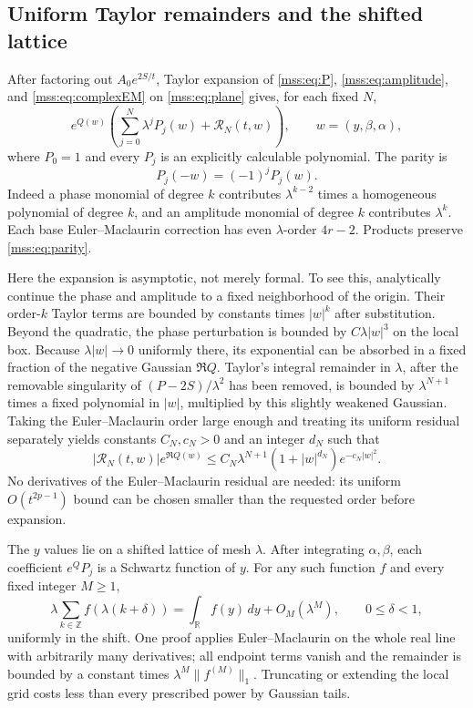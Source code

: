 \documentclass[11pt,letterpaper]{article}
\numberwithin{equation}{section}
\theoremstyle{definition}\newtheorem{definition}[theorem]{Definition}
\theoremstyle{remark}\newtheorem{remark}[theorem]{Remark}
\newcommand{\R}{\mathbb R}
\newcommand{\Z}{\mathbb Z}
\begin{document}
\subsection{Uniform Taylor remainders and the shifted lattice}
After factoring out $A_0e^{2S/t}$, Taylor expansion of \eqref{mss:eq:P}, \eqref{mss:eq:amplitude}, and \eqref{mss:eq:complexEM} on \eqref{mss:eq:plane} gives, for each fixed $N$,
\begin{equation}\label{mss:eq:expansionlocal}
e^{Q(w)}\left(\sum_{j=0}^{N}\lambda^j P_j(w)
+\mathcal R_N(t,w)\right),\qquad w=(y,\beta,\alpha),
\end{equation}
where $P_0=1$ and every $P_j$ is an explicitly calculable polynomial. The parity is
\begin{equation}\label{mss:eq:parity}
P_j(-w)=(-1)^jP_j(w).
\end{equation}
Indeed a phase monomial of degree $k$ contributes $\lambda^{k-2}$ times a homogeneous polynomial of degree $k$, and an amplitude monomial of degree $k$ contributes $\lambda^k$. Each base Euler--Maclaurin correction has even $\lambda$-order $4r-2$. Products preserve \eqref{mss:eq:parity}.

Here the expansion is asymptotic, not merely formal. To see this, analytically continue the phase and amplitude to a fixed neighborhood of the origin. Their order-$k$ Taylor terms are bounded by constants times $|w|^k$ after substitution. Beyond the quadratic, the phase perturbation is bounded by $C\lambda|w|^3$ on the local box. Because $\lambda|w|\to0$ uniformly there, its exponential can be absorbed in a fixed fraction of the negative Gaussian $\Re Q$. Taylor's integral remainder in $\lambda$, after the removable singularity of $(P-2S)/\lambda^2$ has been removed, is bounded by $\lambda^{N+1}$ times a fixed polynomial in $|w|$, multiplied by this slightly weakened Gaussian. Taking the Euler--Maclaurin order large enough and treating its uniform residual separately yields constants $C_N,c_N>0$ and an integer $d_N$ such that
\begin{equation}\label{mss:eq:Taylorbound}
|\mathcal R_N(t,w)|e^{\Re Q(w)}
\le C_N\lambda^{N+1}(1+|w|^{d_N})e^{-c_N|w|^2}.
\end{equation}
No derivatives of the Euler--Maclaurin residual are needed: its uniform $O(t^{2p-1})$ bound can be chosen smaller than the requested order before expansion.

The $y$ values lie on a shifted lattice of mesh $\lambda$. After integrating $\alpha,\beta$, each coefficient $e^QP_j$ is a Schwartz function of $y$. For any such function $f$ and every fixed integer $M\ge1$,
\begin{equation}\label{mss:eq:shifted}
\lambda\sum_{k\in\Z}f(\lambda(k+\delta))
=\int_\R f(y)\,dy+O_M(\lambda^M),
\qquad 0\le\delta<1,
\end{equation}
uniformly in the shift. One proof applies Euler--Maclaurin on the whole real line with arbitrarily many derivatives; all endpoint terms vanish and the remainder is bounded by a constant times $\lambda^M\|f^{(M)}\|_1$. Truncating or extending the local grid costs less than every prescribed power by Gaussian tails.
\end{document}
